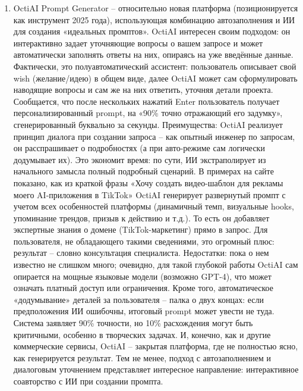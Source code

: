 \begin{enumerate}[label=\arabic*]
\item OctiAI Prompt Generator – относительно новая платформа (позиционируется как инструмент 2025 года), использующая комбинацию автозаполнения и ИИ для создания «идеальных промптов». OctiAI интересен своим подходом: он интерактивно задает уточняющие вопросы о вашем запросе и может автоматически заполнять ответы на них, опираясь на уже введённые данные\cite{octiai:2025}. Фактически, это полуавтоматический ассистент: пользователь описывает свой wish (желание/идею) в общем виде, далее OctiAI может сам сформулировать наводящие вопросы и сам же на них ответить, уточняя детали проекта. Сообщается, что после нескольких нажатий Enter пользователь получает персонализированный prompt, на «90\% точно отражающий его задумку», сгенерированный буквально за секунды\cite{octiai:2025}. Преимущества: OctiAI реализует принцип диалога при создании запроса – как опытный инженер по запросам, он расспрашивает о подробностях (а при авто-режиме сам логически додумывает их). Это экономит время: по сути, ИИ экстраполирует из начального замысла полный подробный сценарий. В примерах на сайте показано, как из краткой фразы «Хочу создать видео-шаблон для рекламы моего AI-приложения в TikTok» OctiAI генерирует развернутый промпт с учетом всех особенностей платформы (динамичный темп, визуальные hooks, упоминание трендов, призыв к действию и т.д.)\cite{octiai:2025}. То есть он добавляет экспертные знания о домене (TikTok-маркетинг) прямо в запрос. Для пользователя, не обладающего такими сведениями, это огромный плюс: результат – словно консультация специалиста. Недостатки: пока о нем известно не слишком много; очевидно, для такой глубокой работы OctiAI сам опирается на мощные языковые модели (возможно GPT-4), что может означать платный доступ или ограничения. Кроме того, автоматическое «додумывание» деталей за пользователя – палка о двух концах: если предположения ИИ ошибочны, итоговый prompt может увести не туда. Система заявляет 90\% точности, но 10\% расхождения могут быть критичными, особенно в творческих задачах. И, конечно, как и другие коммерческие сервисы, OctiAI – закрытая платформа, где не полностью ясно, как генерируется результат. Тем не менее, подход с автозаполнением и диалоговым уточнением представляет интересное направление: интерактивное соавторство с ИИ при создании промпта.
\end{enumerate}

